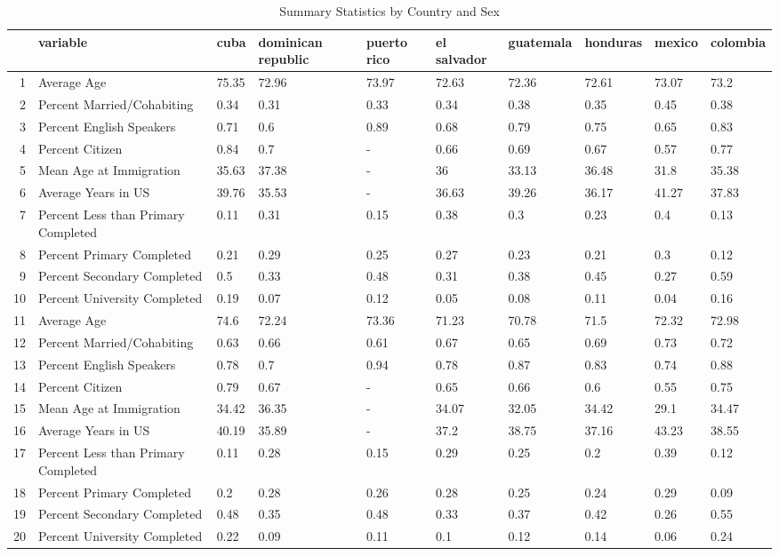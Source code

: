 \begin{table}[ht]
\centering
\caption{Summary Statistics by Country and Sex} 
\label{table2}
\begingroup\small
\begin{tabular}{rlllllllll}
  \hline
 & variable & cuba & dominican republic & puerto rico & el salvador & guatemala & honduras & mexico & colombia \\ 
  \hline
1 & Average Age & 75.35 & 72.96 & 73.97 & 72.63 & 72.36 & 72.61 & 73.07 & 73.2 \\ 
  2 & Percent Married/Cohabiting & 0.34 & 0.31 & 0.33 & 0.34 & 0.38 & 0.35 & 0.45 & 0.38 \\ 
  3 & Percent English Speakers & 0.71 & 0.6 & 0.89 & 0.68 & 0.79 & 0.75 & 0.65 & 0.83 \\ 
  4 & Percent Citizen & 0.84 & 0.7 & - & 0.66 & 0.69 & 0.67 & 0.57 & 0.77 \\ 
  5 & Mean Age at Immigration & 35.63 & 37.38 & - & 36 & 33.13 & 36.48 & 31.8 & 35.38 \\ 
  6 & Average Years in US & 39.76 & 35.53 & - & 36.63 & 39.26 & 36.17 & 41.27 & 37.83 \\ 
  7 & Percent Less than Primary Completed & 0.11 & 0.31 & 0.15 & 0.38 & 0.3 & 0.23 & 0.4 & 0.13 \\ 
  8 & Percent Primary Completed & 0.21 & 0.29 & 0.25 & 0.27 & 0.23 & 0.21 & 0.3 & 0.12 \\ 
  9 & Percent Secondary Completed & 0.5 & 0.33 & 0.48 & 0.31 & 0.38 & 0.45 & 0.27 & 0.59 \\ 
  10 & Percent University Completed & 0.19 & 0.07 & 0.12 & 0.05 & 0.08 & 0.11 & 0.04 & 0.16 \\ 
  11 & Average Age & 74.6 & 72.24 & 73.36 & 71.23 & 70.78 & 71.5 & 72.32 & 72.98 \\ 
  12 & Percent Married/Cohabiting & 0.63 & 0.66 & 0.61 & 0.67 & 0.65 & 0.69 & 0.73 & 0.72 \\ 
  13 & Percent English Speakers & 0.78 & 0.7 & 0.94 & 0.78 & 0.87 & 0.83 & 0.74 & 0.88 \\ 
  14 & Percent Citizen & 0.79 & 0.67 & - & 0.65 & 0.66 & 0.6 & 0.55 & 0.75 \\ 
  15 & Mean Age at Immigration & 34.42 & 36.35 & - & 34.07 & 32.05 & 34.42 & 29.1 & 34.47 \\ 
  16 & Average Years in US & 40.19 & 35.89 & - & 37.2 & 38.75 & 37.16 & 43.23 & 38.55 \\ 
  17 & Percent Less than Primary Completed & 0.11 & 0.28 & 0.15 & 0.29 & 0.25 & 0.2 & 0.39 & 0.12 \\ 
  18 & Percent Primary Completed & 0.2 & 0.28 & 0.26 & 0.28 & 0.25 & 0.24 & 0.29 & 0.09 \\ 
  19 & Percent Secondary Completed & 0.48 & 0.35 & 0.48 & 0.33 & 0.37 & 0.42 & 0.26 & 0.55 \\ 
  20 & Percent University Completed & 0.22 & 0.09 & 0.11 & 0.1 & 0.12 & 0.14 & 0.06 & 0.24 \\ 
   \hline
\end{tabular}
\endgroup
\end{table}
